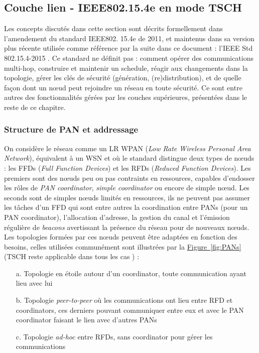 \documentclass[]{report}
\newcommand{\wordlink}[2]{\hyperref[#2]{#1~\ref{#2}}}
\begin{document}
\newpage
	
	\subsection{Couche lien - IEEE802.15.4e en mode TSCH}
	\label{802.15.4e}	

\par Les concepts discutés dans cette section sont décrits formellement dans l'amendement du standard IEEE802. 15.4e de 2011, et maintenus dans sa version plus récente utilisée comme référence par la suite dans ce document : l'IEEE Std 802.15.4-2015 \cite{IEEE802.15.4}. Ce standard ne définit pas \cite{rfc7554} : comment opérer des communications multi-hop, construire et maintenir un schedule, réagir aux changements dans la topologie, gérer les clés de sécurité (génération, (re)distribution), et de quelle façon dont un nœud peut rejoindre un réseau en toute sécurité. Ce sont entre autres des fonctionnalités gérées par les couches supérieures, présentées dans le reste de ce chapitre.
	
\subsubsection{Structure de PAN et addressage}

On considère le réseau comme un LR WPAN (\textit{Low Rate Wireless Personal Area Network}), équivalent à un WSN et où le standard distingue deux types de nœuds : les FFDs (\textit{Full Function Devices}) et les RFDs (\textit{Reduced Function Devices}). Les premiers sont des nœuds peu ou pas contraints en ressources, capables d'endosser les rôles de \textit{PAN coordinator}, \textit{simple coordinator} ou encore de simple nœud. Les seconds sont de simples nœuds limités en ressources, ils ne peuvent pas assumer les tâches d'un FFD qui sont entre autres la coordination entre PANs (pour un PAN coordinator), l'allocation d'adresse, la gestion du canal et l'émission régulière de \textit{beacons} avertissant la présence du réseau pour de nouveaux nœuds. Les topologies formées par ces nœuds peuvent être adaptées en fonction des besoins, celles utilisées communément sont illustrées par la \wordlink{Figure}{fig:PANs} (TSCH reste applicable dans tous les cas \cite{IEEE802.15.4}) :
\vspace{0.2cm}
\begin{itemize}
\item[a.] Topologie en étoile autour d'un coordinator, toute communication ayant lieu avec lui
\vspace{0.1cm}
\item[b.] Topologie \textit{peer-to-peer} où les communications ont lieu entre RFD et coordinators, ces derniers pouvant communiquer entre eux et avec le PAN coordinator faisant le lien avec d'autres PANs
\vspace{0.1cm}
\item[c.] Topologie \textit{ad-hoc} entre RFDs, sans coordinator pour gérer les communications
\end{itemize}
\end{document}
